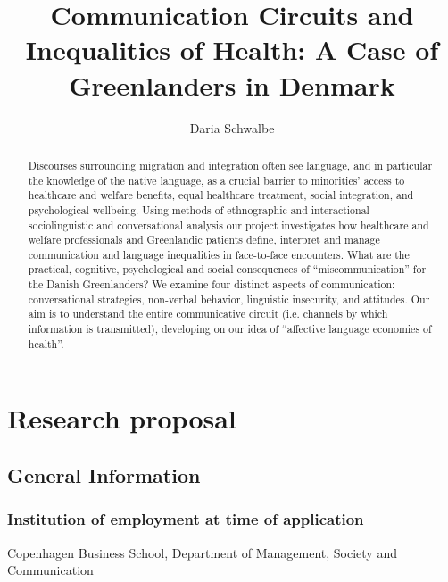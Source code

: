 \documentclass[twocolumn, serif, rga, authordate]{jote-article}
\title{Communication Circuits and Inequalities of Health: A Case of Greenlanders in Denmark}
\author[1]{Daria Schwalbe}
\affil[1]{University of Southern Denmark, SDU · Department of Language and Communication}
\begin{document}
    \begin{frontmatter}
    \maketitle
    \begin{abstract}

Discourses surrounding migration and integration often see language, and in particular the knowledge of the native language, as a crucial barrier to minorities' access to healthcare and welfare benefits, equal healthcare treatment, social integration, and psychological wellbeing.
Using methods of ethnographic and interactional sociolinguistic and conversational analysis our project investigates how healthcare and welfare professionals and Greenlandic patients define, interpret and manage communication and language inequalities in face-to-face encounters. What are the practical, cognitive, psychological and social consequences of ``miscommunication'' for the Danish Greenlanders? We examine four distinct aspects of communication: conversational strategies, non-verbal behavior, linguistic insecurity, and attitudes.
Our aim is to understand the entire communicative circuit (i.e. channels by which information is transmitted), developing on our idea of
``affective language economies of health''.
    \end{abstract}
    \end{frontmatter}




\section*{Research proposal}



\subsection*{General Information}



\subsubsection*{Institution of employment at time of application}


Copenhagen Business School, Department of Management, Society and Communication
\end{document}
